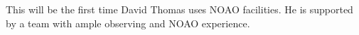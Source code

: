 \documentclass[11pt]{article}
\begin{document}
%

\thepast

This will be the first time David Thomas uses NOAO facilities. He is supported by a team with ample observing and NOAO experience. 


%



%

\technicaldescription
\end{document}
